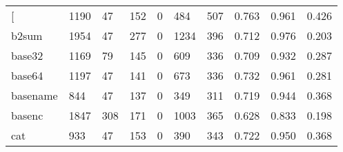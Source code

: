 \begin{longtable}{lp{2.0cm}p{2.0cm}p{2.0cm}p{2.0cm}p{2.0cm}p{2.0cm}p{2.0cm}p{2.0cm}p{2.0cm}}
\bottomrule
\endlastfoot
{[}         &                   1190 &                                 47 &                               152 &                                0 &                               484 &                             507 &                                   0.763 &                                  0.961 &                                0.426 \\
b2sum     &                   1954 &                                 47 &                               277 &                                0 &                              1234 &                             396 &                                   0.712 &                                  0.976 &                                0.203 \\
base32    &                   1169 &                                 79 &                               145 &                                0 &                               609 &                             336 &                                   0.709 &                                  0.932 &                                0.287 \\
base64    &                   1197 &                                 47 &                               141 &                                0 &                               673 &                             336 &                                   0.732 &                                  0.961 &                                0.281 \\
basename  &                    844 &                                 47 &                               137 &                                0 &                               349 &                             311 &                                   0.719 &                                  0.944 &                                0.368 \\
basenc    &                   1847 &                                308 &                               171 &                                0 &                              1003 &                             365 &                                   0.628 &                                  0.833 &                                0.198 \\
cat       &                    933 &                                 47 &                               153 &                                0 &                               390 &                             343 &                                   0.722 &                                  0.950 &                                0.368 \\

\end{longtable}
